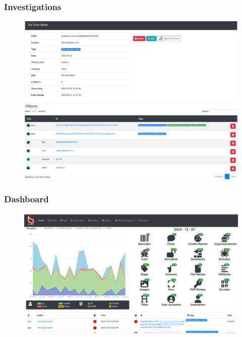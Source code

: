 \documentclass[10pt,aspectratio=169, colorlinks=true, linkcolor=circlBlue]{beamer}
\begin{document}
\begin{frame}
    \frametitle{Investigations}
    \begin{figure}
        \includegraphics[scale=0.22, angle=0]{screenshot/investigation_mixer.png}
    \end{figure}
\end{frame}



\begin{frame}
    \frametitle{Dashboard}
    \begin{figure}
        \includegraphics[scale=0.18, angle=0]{screenshot/dashboard.jpeg}
    \end{figure}
\end{frame}
\end{document}
